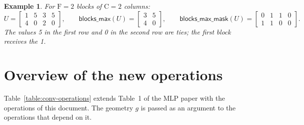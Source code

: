 \documentclass[twoside,11pt]{article}
\newtheorem{example}{Example}
\newcommand{\const}[1]{\ensuremath{\mathrm{#1}}} %
\newcommand{\func}[1]{\ensuremath{\textsf{#1}}}  %
\newcommand{\Fs}{\const{F}}          %
\newcommand{\bmax}{\func{blocks\_max}}
\newcommand{\bmask}{\func{blocks\_max\_mask}}
\begin{document}
\begin{example} \label{example:blocks}
For $\Fs = 2$ blocks of $\const{C} = 2$ columns:
\[
U = \left[\begin{array}{cc|cc} 1 & 5 & 3 & 5 \\ 4 & 0 & 2 & 0 \end{array}\right],
\qquad
\bmax(U) = \begin{bmatrix} 3 & 5 \\ 4 & 0 \end{bmatrix},
\qquad
\bmask(U) = \left[\begin{array}{cc|cc} 0 & 1 & 1 & 0 \\ 1 & 1 & 0 & 0 \end{array}\right].
\]
The values 5 in the first row and 0 in the second row are ties; the first block receives the 1.
\end{example}

\section{Overview of the new operations} \label{section:operations-table}

Table~\ref{table:conv-operations} extends Table~1 of the MLP paper with the operations of this document.
The geometry $g$ is passed as an argument to the operations that depend on it.
\end{document}
